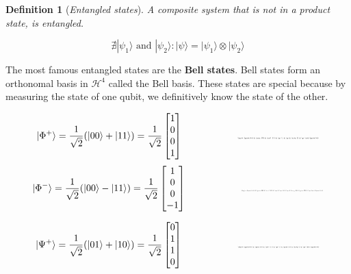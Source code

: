 \documentclass[12pt,a4paper]{report}
\newtheorem{definition}{Definition}
\begin{document}
\begin{definition}[\emph{Entangled states}]
A composite system that is not in a product state, is entangled.

\[
\nexists |\psi_1\rangle \text{ and } |\psi_2\rangle : |\psi\rangle = |\psi_1\rangle \otimes |\psi_2\rangle
\]

\end{definition}

\noindent
The most famous entangled states are the \textbf{Bell states}. Bell states form an orthonomal basis in $\mathcal{H}^4$ called the Bell basis. These states are special because by measuring the state of one qubit, we definitively know the state of the other.

\[ 
|\Phi^+\rangle = \frac{1}{\sqrt{2}}(|00\rangle + |11\rangle) = \frac{1}{\sqrt{2}}\begin{bmatrix}
    1 \\
    0 \\
    0 \\
    1
\end{bmatrix} 
\hspace{2cm}
\resizebox{0.25\textwidth}{!}{
    \begin{quantikz}
       & \gate{H} & \ctrl{1} & \qw \\
       & \qw & \targ{} & \qw
    \end{quantikz}
}
\]
\[ 
|\Phi^-\rangle = \frac{1}{\sqrt{2}}(|00\rangle - |11\rangle) = \frac{1}{\sqrt{2}}\begin{bmatrix}
    1 \\
    0 \\
    0 \\
    -1
\end{bmatrix}
\hspace{2cm}
\resizebox{0.25\textwidth}{!}{
    \begin{quantikz}
       & \gate{H} & \ctrl{1} & \qw & \qw \\
       & \qw & \targ{} & \gate{Z} & \qw
    \end{quantikz}
}
\]

\[ 
|\Psi^+\rangle = \frac{1}{\sqrt{2}}(|01\rangle + |10\rangle) = \frac{1}{\sqrt{2}}\begin{bmatrix}
    0 \\
    1 \\
    1 \\
    0
\end{bmatrix}
\hspace{2cm}
\resizebox{0.25\textwidth}{!}{
    \begin{quantikz}
       & \gate{H} & \ctrl{1} & \qw \\
       & \gate{X} & \targ{} & \qw
    \end{quantikz}
}
\]
\end{document}
